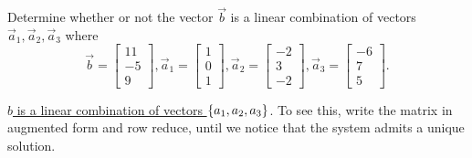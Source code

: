 \documentclass[answers,11pt]{exam}
\theoremstyle{definition}
\theoremstyle{definition}
\DeclareMathOperator{\1}{\mathbbm{1}}
\begin{document}
\begin{questions}
\question[25] Determine whether or not the vector $\vec{b}$ is a linear combination of vectors $\vec{a}_1,\vec{a}_2,\vec{a}_3$ where
\begin{equation*}
\vec{b}=
\begin{bmatrix}
11\\
-5\\
9
\end{bmatrix}, 
\vec{a}_1=
\begin{bmatrix}
1\\
0\\
1
\end{bmatrix},
\vec{a}_2=
\begin{bmatrix}
-2\\
3\\
-2
\end{bmatrix},
\vec{a}_3=
\begin{bmatrix}
-6\\
7\\
5
\end{bmatrix}.
\end{equation*}
\addpoints

\begin{solution}
	
	\uline{$b$ is a linear combination of vectors $\set{a_1,a_2,a_3}$}. To see this, write the matrix in augmented form and row reduce, until we notice that the system admits a unique solution.
	

\end{solution}
\end{questions}
\end{document}
